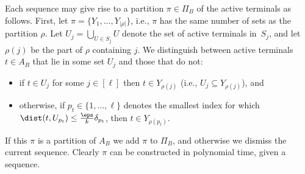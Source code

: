 Each sequence may give rise to a partition $\pi\in\Pi_B$ of the active terminals as follows.
First, let $\pi=\{Y_1,\ldots,Y_{|\rho|}\}$, i.e., $\pi$ has the same number of sets as the partition $\rho$.
Let $U_j=\bigcup_{U\in S_j} U$ denote the set of active terminals in~$S_j$, 
and let $\rho(j)$ be the part of $\rho$ containing $j$.
We distinguish between active terminals $t\in A_B$ that lie in some set $U_j$ and those that do not:
\begin{itemize}
    \item if $t\in U_j$ for some $j\in[\ell]$ then $t\in Y_{\rho(j)}$ (i.e., $U_j\subseteq Y_{\rho(j)}$), and
    \item otherwise, if $p_t\in\{1,\ldots,\ell\}$ denotes the smallest index for which $\dist(t,U_{p_t})\leq\frac{\eps}{k}\delta_{p_t}$, then $t\in Y_{\rho(p_t)}$.
\end{itemize}
If this $\pi$ is a partition of $A_B$ we add $\pi$ to $\Pi_B$, and otherwise we dismiss the current sequence.
Clearly $\pi$ can be constructed in polynomial time, given a sequence.

